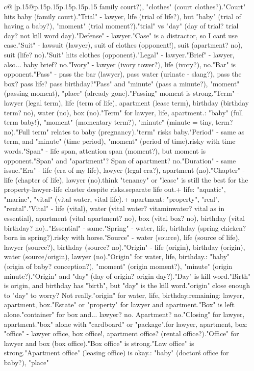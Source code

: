 \documentclass{article}
\begin{document}
{\begin{supertabular}{c@{$\;$}|p{.15\linewidth}@{}p{.15\linewidth}p{.15\linewidth}p{.15\linewidth}p{.15\linewidth}p{.15\linewidth}}
{{{family court?), "clothes" (court clothes?).\n"Court" hits baby (family court).\n\n"Trial" - lawyer, life (trial of life?), but "baby" (trial of having a baby?), "moment" (trial moment?).\nAnd "trial" vs "day" (day of trial? trial day? not kill word day).\n\n"Defense" - lawyer.\n\n"Case" is a distractor, so I can\'t use case.\n\n"Suit" - lawsuit (lawyer), suit of clothes (opponent!), suit (apartment? no), suit (life? no).\n"Suit" hits clothes (opponent).\n\n"Legal" - lawyer.\n"Brief" - lawyer, also... baby brief? no.\n\n"Ivory" - lawyer (ivory tower?), life (ivory?), no.\n\n"Bar" is opponent.\n\n"Pass" - pass the bar (lawyer), pass water (urinate - slang?), pass the box? pass life? pass birthday?\n"Pass" and "minute" (pass a minute?), "moment" (passing moment), "place" (already gone).\n"Passing" moment is strong.\n\n"Term" - lawyer (legal term), life (term of life), apartment (lease term), birthday (birthday term? no), water (no), box (no).\n"Term" for lawyer, life, apartment.\nRisks: "baby" (full term baby!), "moment" (momentary term?), "minute" (minute = tiny, term? no).\n"Full term" relates to baby (pregnancy).\nSo "term" risks baby.\n\n"Period" - same as term, and "minute" (time period), "moment" (period of time).\nToo risky with time words.\n\n"Span" - life span, attention span (moment?), but moment is opponent.\n"Span" and "apartment"? Span of apartment? no.\n\n"Duration" - same issue.\n\n"Era" - life (era of my life), lawyer (legal era?), apartment (no).\n\n"Chapter" - life (chapter of life), lawyer (no).\n\nI think "tenancy" or "lease" is still the best for the property-lawyer-life cluster despite risks.\n\nOr separate life out.\nWater + life: "aquatic", "marine", "vital" (vital water, vital life).\nLawyer + apartment: "property", "real", "rental".\n\n"Vital" - life (vital), water (vital water? vitaminwater? vital as in essential), apartment (vital apartment? no), box (vital box? no), birthday (vital birthday? no)..\n\n"Essential" - same.\n\n"Spring" - water, life, birthday (spring chicken? born in spring?).\nBut risky with horse.\n\n"Source" - water (source), life (source of life), lawyer (source?), birthday (source? no).\n\n"Origin" - life (origin), birthday (origin), water (source/origin), lawyer (no).\n"Origin" for water, life, birthday.\nRisks: "baby" (origin of baby? conception?), "moment" (origin moment?), "minute" (origin minute?).\n"Origin" and "day" (day of origin? origin day?).\n"Day" is kill word.\n"Birth" is origin, and birthday has "birth", but "day" is the kill word.\nIs "origin" close enough to "day" to worry? Not really.\n\nSo "origin" for water, life, birthday.\nThen remaining: lawyer, apartment, box.\n"Estate" or "property" for lawyer and apartment.\n"Box" is left alone.\nOr "container" for box and... lawyer? no. Apartment? no.\n\n"Closing" for lawyer, apartment.\nThen "box" alone with "cardboard" or "package".\n\nOr for lawyer, apartment, box: "office" - lawyer office, box office!, apartment office? (rental office?).\n"Office" for lawyer and box (box office).\n"Box office" is strong.\n"Law office" is strong.\n"Apartment office" (leasing office) is okay.\nRisks: "baby" (doctor\'s office for baby?), "place" }}}
\end{supertabular}}
\end{document}
